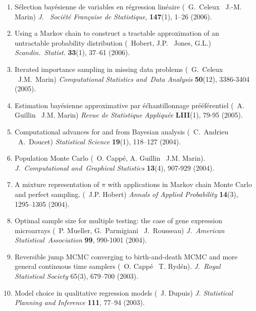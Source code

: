 \begin{enumerate}
\item S\'election bay\'esienne de variables en r\'egression lin\'eaire
(\avec~G.~Celeux \et\ J.-M. Marin)
{\em J.~ Société Fran\c caise de Statistique}, {\bf 147}(1), 1--26 (2006).

\item Using a Markov chain to construct a tractable approximation of an untractable
probability distribution (\avec\ Hobert, J.P. \et\ Jones, G.L.)
{\it Scandin.~Statist.} {\bf 33}(1), 37--61 (2006).

\item Iterated importance sampling in missing data problems
(\avec\ G.~Celeux \et\ J.M.~Marin) {\it Computational 
Statistics and~Data Analysis} {\bf 50}(12), 3386-3404 (2005).

\item Estimation bay\'esienne approximative par é\'chantillonnage pré\'ef\'erentiel
(\avec\ A. Guillin \et\ J.M. Marin)
{\it Revue de Statistique Appliqu\'ee} {\bf LIII}(1), 79-95 (2005).

\item Computational advances for and from Bayesian analysis
(\avec\ C.~Andrieu \et\ A.~Doucet) {\em Statistical Science}
{\bf 19}(1), 118--127 (2004).

\item Population Monte Carlo (\avec\ O. Capp\'e, A. Guillin \et\ J.M. Marin).
{\it J.~Computational and~Graphical Statistics} {\bf 13}(4), 907-929 (2004).

\item A mixture representation of $\pi$ with applications in Markov chain Monte Carlo and perfect sampling.
(\avec\ J.P. Hobert) {\it Annals of Applied Probability} {\bf 14}(3), 1295--1305 (2004).

\item Optimal sample size for multiple testing: the case of 
gene expression microarrays (\avec\ P. Mueller, G.~Parmigiani \et\
J.~Rousseau) {\it J.~American Statistical~Association} {\bf 99}, 990-1001 (2004).

\item  Reversible jump MCMC converging to birth-and-death MCMC and
more general continuous time samplers (\avec\ O. Capp\'e \et\ T. Ryd\'en).
{\it J.~Royal Statistical Society} 65(3), 679--700 (2003).

\item Model choice in qualitative regression models 
(\avec\ J. Dupuis) {\it  J. Statistical Planning and Inference} {\bf 111},
77--94 (2003).


\end{enumerate}
